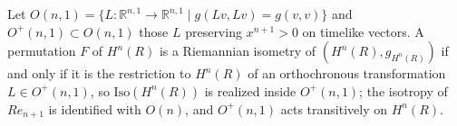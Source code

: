 \begin{example}
  \label{ex:pet-ch1-isometry-group-hyperbolic}
  \leanok
  Let $O(n,1)=\{L:\mathbb{R}^{n,1}\to\mathbb{R}^{n,1}\mid g(Lv,Lv)=g(v,v)\}$ and
  $O^+(n,1)\subset O(n,1)$ those $L$ preserving $x^{n+1}>0$ on timelike
  vectors. A permutation $F$ of $H^n(R)$ is a Riemannian isometry of
  $(H^n(R),g_{H^n(R)})$ if and only if it is the restriction to $H^n(R)$ of
  an orthochronous transformation $L\in O^+(n,1)$, so $\mathrm{Iso}(H^n(R))$
  is realized inside $O^+(n,1)$; the isotropy of $Re_{n+1}$ is identified with
  $O(n)$, and $O^+(n,1)$ acts transitively on $H^n(R)$.
\end{example}
